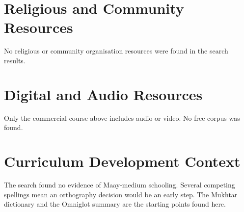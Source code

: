 \documentclass[12pt]{article}
\begin{document}
\section{Religious and Community Resources}
No religious or community organisation resources were found in the search results.

\section{Digital and Audio Resources}
Only the commercial course above includes audio or video. No free corpus was found.

\section{Curriculum Development Context}
The search found no evidence of Maay-medium schooling. Several competing spellings mean an orthography decision would be an early step. The Mukhtar dictionary and the Omniglot summary are the starting points found here.
\end{document}
